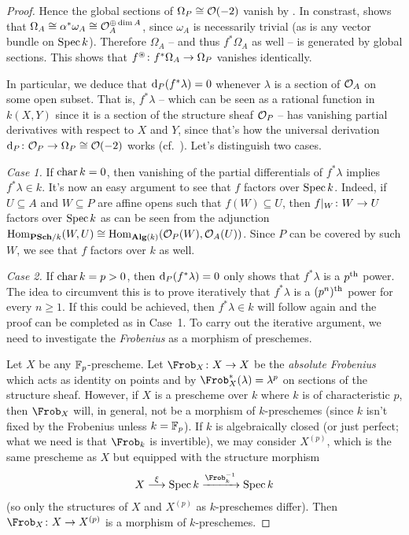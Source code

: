 \documentclass[a4paper,parskip=half,numbers=enddot, DIV=12]{scrreprt}
\renewcommand{\geq}{\geqslant}
\begin{document}
\begin{proof}
	Hence the global sections of $\Omega_P\cong \mathcal{O}(-2)$ vanish by \cite[Theorem~2]{alggeo2}. In constrast,  shows that $\Omega_A\cong\alpha^*\omega_A\cong \mathcal{O}_A^{\oplus\dim A}$, since $\omega_A$ is necessarily trivial (as is any vector bundle on $\operatorname{Spec} k$). Therefore $\Omega_A$ -- and thus $f^*\Omega_A$ as well -- is generated by global sections. This shows that $f^\oast\colon f^*\Omega_A\morphism \Omega_P$ vanishes identically.
	
	In particular, we deduce that $\mathop{}\!\mathrm{d}_P(f^*\lambda)=0$ whenever $\lambda$ is a section of $\mathcal{O}_A$ on some open subset. That is, $f^*\lambda$ -- which can be seen as a rational function in $k(X,Y)$ since it is a section of the structure sheaf $\mathcal{O}_P$ -- has vanishing partial derivatives with respect to $X$ and $Y$, since that's how the universal derivation $\d_P\colon \Oo_P\morphism\Omega_P\cong \Oo(-2)$ works (cf.\ \cite[85]{alggeo2}). Let's distinguish two cases.
	
	\emph{Case 1.} If $\operatorname{char} k=0$, then vanishing of the partial differentials of $f^*\lambda$ implies $f^*\lambda\in k$. It's now an easy argument to see that $f$ factors over $\operatorname{Spec} k$. Indeed, if $U\subseteq A$ and $W\subseteq P$ are affine opens such that $f(W)\subseteq U$, then $f|_W\colon W\morphism U$ factors over $\operatorname{Spec} k$ as can be seen from the adjunction $\Hom_{\cat{PSch}/k}(W,U)\cong \Hom_{\cat{Alg}(k)}(\Oo_P(W),\Oo_A(U))$. Since $P$ can be covered by such $W$, we see that $f$ factors over $k$ as well.
	
	\emph{Case 2.} If $\operatorname{char} k=p>0$, then $\mathop{}\!\mathrm{d}_P(f^*\lambda)=0$ only shows that $f^*\lambda$ is a $p^{\text{th}}$ power. The idea to circumvent this is to prove iteratively that $f^*\lambda$ is a $(p^n)^{\text{th}}$ power for every $n\geq 1$. If this could be achieved, then $f^*\lambda\in k$ will follow again and the proof can be completed as in Case~1. To carry out the iterative argument, we need to investigate the \emph{Frobenius} as a morphism of preschemes.
	
	Let $X$ be any $\mathbb{F}_p$-prescheme. Let $\Frob_X\colon X\morphism X$ be the \emph{absolute Frobenius} which acts as identity on points and by $\Frob_X^*(\lambda)=\lambda^p$ on sections of the structure sheaf. However, if $X$ is a prescheme over $k$ where $k$ is of characteristic $p$, then $\Frob_X$ will, in general, not be a morphism of $k$-preschemes (since $k$ isn't fixed by the Frobenius unless $k=\mathbb{F}_p$). If $k$ is algebraically closed (or just perfect; what we need is that $\Frob_k$ is invertible), we may consider $X^{(p)}$, which is the same prescheme as $X$ but equipped with the structure morphism
	\begin{align*}
		X\morphism[\xi]\Spec k\xrightarrow{\Frob_k^{-1}}\Spec k
	\end{align*}
	(so only the structures of $X$ and $X^{(p)}$ as $k$-preschemes differ). Then $\Frob_X\colon X\morphism X^{(p)}$ is a  morphism of $k$-preschemes.
	

\end{proof}
\end{document}
